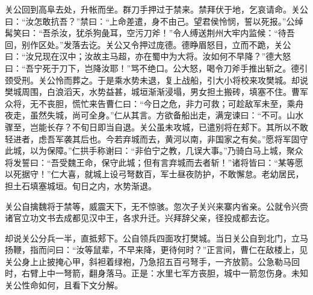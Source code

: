 关公回到高阜去处，升帐而坐。群刀手押过于禁来。禁拜伏于地，乞哀请命。关公曰：“汝怎敢抗吾？”禁曰：“上命差遣，身不由己。望君侯怜悯，誓以死报。”公绰髯笑曰：“吾杀汝，犹杀狗彘耳，空污刀斧！”令人缚送荆州大牢内监候：“待吾回，别作区处。”发落去讫。关公又令押过庞德。德睁眉怒目，立而不跪，关公曰：“汝兄现在汉中；汝故主马超，亦在蜀中为大将。汝如何不早降？”德大怒曰：“吾宁死于刀下，岂降汝耶！”骂不绝口。公大怒，喝令刀斧手推出斩之。德引颈受刑。关公怜而葬之。于是乘水势未退，复上战船，引大小将校来攻樊城。却说樊城周围，白浪滔天，水势益甚，城垣渐渐浸塌，男女担土搬砖，填塞不住。曹军众将，无不丧胆，慌忙来告曹仁曰：“今日之危，非力可救；可趁敌军未至，乘舟夜走，虽然失城，尚可全身。”仁从其言。方欲备船出走，满宠谏曰：“不可。山水骤至，岂能长存？不旬日即当自退。关公虽未攻城，已遣别将在郏下。其所以不敢轻进者，虑吾军袭其后也。今若弃城而去，黄河以南，非国家之有矣。”愿将军固守此城，以为保障。”仁拱手称谢曰：“非伯宁之教，几误大事。”乃骑白马上城，聚众将发誓曰：“吾受魏王命，保守此城；但有言弃城而去者斩！”诸将皆曰：“某等愿以死据守！”仁大喜，就城上设弓弩数百，军士昼夜防护，不敢懈怠。老幼居民，担土石填塞城垣。旬日之内，水势渐退。

关公自擒魏将于禁等，威震天下，无不惊骇。忽次子关兴来寨内省亲。公就令兴赍诸官立功文书去成都见汉中王，各求升迁。兴拜辞父亲，径投成都去讫。

却说关公分兵一半，直抵郏下。公自领兵四面攻打樊城。当日关公自到北门，立马扬鞭，指而问曰：“汝等鼠辈，不早来降，更待何时？”正言间，曹仁在敌楼上，见关公身上止披掩心甲，斜袒着绿袍，乃急招五百弓弩手，一齐放箭。公急勒马回时，右臂上中一弩箭，翻身落马。正是：水里七军方丧胆，城中一箭忽伤身。未知关公性命如何，且看下文分解。